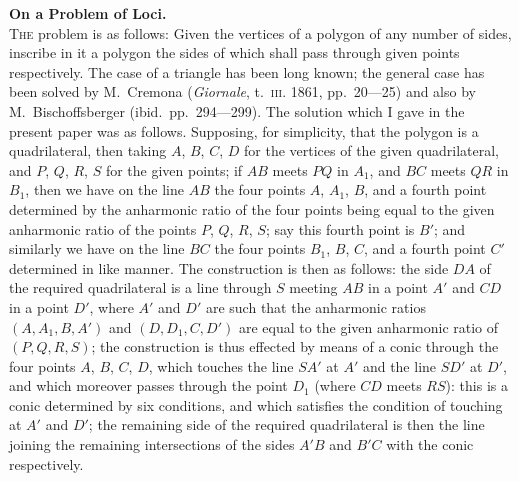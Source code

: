 \documentclass[11pt,a4paper]{article}
\begin{document}
\noindent
\textbf{On a Problem of Loci.}\\[4pt]
\noindent
\textsc{The} problem is as follows: Given the vertices of a polygon of any number of sides, inscribe in it a polygon the sides of which shall pass through given points respectively. The case of a triangle has been long known; the general case has been solved by M.~Cremona (\textit{Giornale}, t.~\textsc{iii}. 1861, pp.~20---25) and also by M.~Bischoffsberger (ibid.\ pp.~294---299). The solution which I gave in the present paper was as follows. Supposing, for simplicity, that the polygon is a quadrilateral, then taking $A$, $B$, $C$, $D$ for the vertices of the given quadrilateral, and $P$, $Q$, $R$, $S$ for the given points; if $AB$ meets $PQ$ in $A_{1}$, and $BC$ meets $QR$ in $B_{1}$, then we have on the line $AB$ the four points $A$, $A_{1}$, $B$, and a fourth point determined by the anharmonic ratio of the four points being equal to the given anharmonic ratio of the points $P$, $Q$, $R$, $S$; say this fourth point is $B'$; and similarly we have on the line $BC$ the four points $B_{1}$, $B$, $C$, and a fourth point $C'$ determined in like manner. The construction is then as follows: the side $DA$ of the required quadrilateral is a line through $S$ meeting $AB$ in a point $A'$ and $CD$ in a point $D'$, where $A'$ and $D'$ are such that the anharmonic ratios $(A, A_{1}, B, A')$ and $(D, D_{1}, C, D')$ are equal to the given anharmonic ratio of $(P, Q, R, S)$; the construction is thus effected by means of a conic through the four points $A$, $B$, $C$, $D$, which touches the line $SA'$ at $A'$ and the line $SD'$ at $D'$, and which moreover passes through the point $D_{1}$ (where $CD$ meets $RS$): this is a conic determined by six conditions, and which satisfies the condition of touching at $A'$ and $D'$; the remaining side of the required quadrilateral is then the line joining the remaining intersections of the sides $A'B$ and $B'C$ with the conic respectively.

\vspace{24pt}
\end{document}
